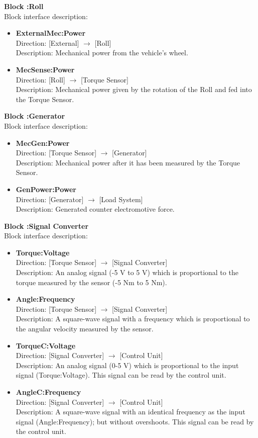 \textbf{Block :Roll}\\
Block interface description:
\begin{itemize}
	\item \textbf{ExternalMec:Power}\\
	Direction: [External] $\rightarrow$ [Roll]\\
	Description: Mechanical power from the vehicle's wheel.
	\item \textbf{MecSense:Power}\\
	Direction: [Roll] $\rightarrow$ [Torque Sensor]\\
	Description: Mechanical power given by the rotation of the Roll and fed into the Torque Sensor.
\end{itemize}
					
\textbf{Block :Generator}\\
Block interface description:
\begin{itemize}
	\item \textbf{MecGen:Power}\\
	Direction: [Torque Sensor] $\rightarrow$ [Generator]\\
	Description: Mechanical power after it has been measured by the Torque Sensor.
	\item \textbf{GenPower:Power}\\
	Direction: [Generator] $\rightarrow$ [Load System]\\
	Description: Generated counter electromotive force.
\end{itemize}
			
\textbf{Block :Signal Converter}\\
Block interface description:
\begin{itemize}
	\item \textbf{Torque:Voltage}\\
	Direction: [Torque Sensor] $\rightarrow$ [Signal Converter]\\
	Description: An analog signal (-5 V to 5 V) which is proportional to the torque measured by the sensor (-5 Nm to 5 Nm).
	\item \textbf{Angle:Frequency}\\
	Direction: [Torque Sensor] $\rightarrow$ [Signal Converter]\\
	Description: A square-wave signal with a frequency which is proportional to the angular velocity measured by the sensor.
	\item \textbf{TorqueC:Voltage}\\
	Direction: [Signal Converter] $\rightarrow$ [Control Unit]\\
	Description: An analog signal (0-5 V) which is proportional to the input signal (Torque:Voltage). This signal can be read by the control unit.
	\item \textbf{AngleC:Frequency}\\
	Direction: [Signal Converter] $\rightarrow$ [Control Unit]\\
	Description: A square-wave signal with an identical frequency as the input signal (Angle:Frequency); but without overshoots. This signal can be read by the control unit.
\end{itemize}
							
